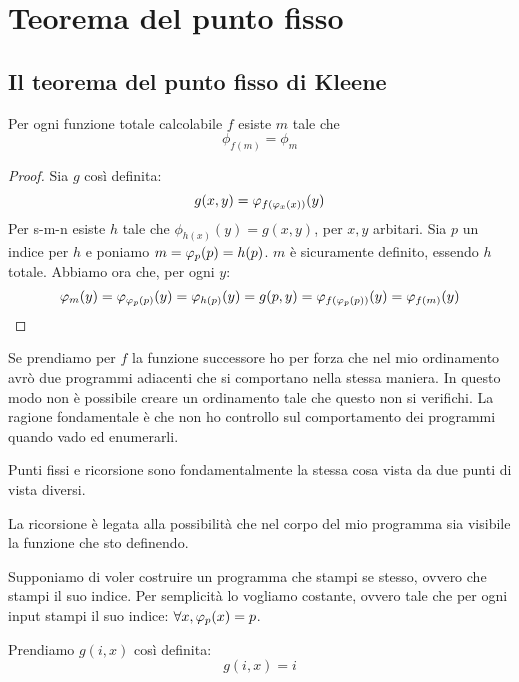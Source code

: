 \chapter{Teorema del punto fisso}

\section{Il teorema del punto fisso di Kleene}

\begin{thm}
    Per ogni funzione totale calcolabile $f$ esiste $m$ tale che 
    \begin{equation*}
        \phi_{f(m)} = \phi_{m}
    \end{equation*}
\end{thm}
\begin{proof}
    Sia $g$ così definita:
    \begin{equation*}
        g(x,y) = \varphi_{f(\varphi_{x}(x))}(y)
    \end{equation*}
    Per s-m-n esiste $h$ tale che $\phi_{h(x)}(y) = g(x,y)$, per $x,y$ arbitari. Sia $p$ un indice
    per $h$ e poniamo $m = \varphi_{p}(p) = h(p)$. $m$ è sicuramente definito, essendo $h$ totale.
    Abbiamo ora che, per ogni $y$:
    \begin{equation*}
        \varphi_{m}(y) = \varphi_{\varphi_{p}(p)}(y) = \varphi_{h(p)}(y) = g(p,y) = \varphi_{f(\varphi_{p}(p))}(y) =
        \varphi_{f(m)}(y)
    \end{equation*}
\end{proof}

Se prendiamo per $f$ la funzione successore ho per forza che nel mio ordinamento avrò due programmi
adiacenti che si comportano nella stessa maniera. In questo modo non è possibile creare un
ordinamento tale che questo non si verifichi. La ragione fondamentale è che non ho controllo sul
comportamento dei programmi quando vado ed enumerarli.

Punti fissi e ricorsione sono fondamentalmente la stessa cosa vista da due punti di vista diversi.

La ricorsione è legata alla possibilità che nel corpo del mio programma sia visibile la funzione
che sto definendo.

Supponiamo di voler costruire un programma che stampi se stesso, ovvero che stampi il suo indice.
Per semplicità lo vogliamo costante, ovvero tale che per ogni input stampi il suo indice: $\forall
x, \varphi_{p}(x) = p$.

Prendiamo $g(i,x)$ così definita:
\begin{equation*}
    g(i,x) = i
\end{equation*}

